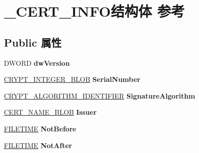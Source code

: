 \hypertarget{struct___c_e_r_t___i_n_f_o}{}\section{\+\_\+\+C\+E\+R\+T\+\_\+\+I\+N\+F\+O结构体 参考}
\label{struct___c_e_r_t___i_n_f_o}
\subsection*{Public 属性}
\begin{DoxyCompactItemize}
\item 
\mbox{\label{struct___c_e_r_t___i_n_f_o_ab1ab3f046b65d8386e11d449383d31a2}} 
D\+W\+O\+RD {\bfseries dw\+Version}
\item 
\mbox{\label{struct___c_e_r_t___i_n_f_o_ac3e0a33549c9cbe387468ecb067a81c1}} 
\hyperlink{struct___c_r_y_p_t_o_a_p_i___b_l_o_b}{C\+R\+Y\+P\+T\+\_\+\+I\+N\+T\+E\+G\+E\+R\+\_\+\+B\+L\+OB} {\bfseries Serial\+Number}
\item 
\mbox{\label{struct___c_e_r_t___i_n_f_o_adfd395b8d5ed92d7bbed34e3ef2b5a06}} 
\hyperlink{struct___c_r_y_p_t___a_l_g_o_r_i_t_h_m___i_d_e_n_t_i_f_i_e_r}{C\+R\+Y\+P\+T\+\_\+\+A\+L\+G\+O\+R\+I\+T\+H\+M\+\_\+\+I\+D\+E\+N\+T\+I\+F\+I\+ER} {\bfseries Signature\+Algorithm}
\item 
\mbox{\label{struct___c_e_r_t___i_n_f_o_a87f6261861077dac3879f0c623630a36}} 
\hyperlink{struct___c_r_y_p_t_o_a_p_i___b_l_o_b}{C\+E\+R\+T\+\_\+\+N\+A\+M\+E\+\_\+\+B\+L\+OB} {\bfseries Issuer}
\item 
\mbox{\label{struct___c_e_r_t___i_n_f_o_ad72e014c30704ee8438c9e9c689aae2a}} 
\hyperlink{struct___f_i_l_e_t_i_m_e}{F\+I\+L\+E\+T\+I\+ME} {\bfseries Not\+Before}
\item 
\mbox{\label{struct___c_e_r_t___i_n_f_o_af24470bc2ed151d9cdb5e955f8433997}} 
\hyperlink{struct___f_i_l_e_t_i_m_e}{F\+I\+L\+E\+T\+I\+ME} {\bfseries Not\+After}
\item 
\mbox{\label{struct___c_e_r_t___i_n_f_o_a1cc0372dfe3c2bba7b6c68008a720c6b}} 

\end{DoxyCompactItemize}
